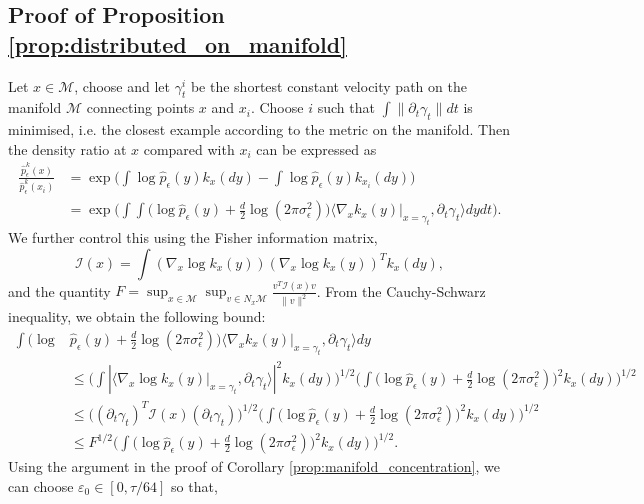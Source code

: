 \documentclass[10pt]{article}
\theoremstyle{plain}
\theoremstyle{definition}
\theoremstyle{remark}
\newcommand{\M}{{\mathcal{M}}}
\begin{document}
\subsection{Proof of Proposition \ref{prop:distributed_on_manifold}}
Let \(x \in \M\), choose and let \(\gamma^i_t\) be the shortest constant velocity path on the manifold \(\M\) connecting points \(x\) and \(x_i\). Choose \(i\) such that \(\int \|\partial_t \gamma_t\| dt\) is minimised, i.e. the closest example according to the metric on the manifold. Then the density ratio at \(x\) compared with \(x_i\) can be expressed as
\begin{align*}
    \frac{\hat{p}^{k}_\epsilon(x)}{\hat{p}^{k}_\epsilon(x_i)} &= \exp \bigg ( \int \log \hat{p}_\epsilon(y) k_{x}(dy) - \int \log \hat{p}_\epsilon(y) k_{x_i}(dy) \bigg )\\
    &= \exp \bigg ( \int \int \Big ( \log \hat{p}_\epsilon(y) + \frac{d}{2}\log(2\pi\sigma_\epsilon^2) \Big ) \langle \nabla_x k_{x}(y)\vert_{x=\gamma_t}, \partial_t \gamma_t \rangle dy dt \bigg ).
\end{align*}
We further control this using the Fisher information matrix,
\begin{equation*}
    \mathcal{I}(x) = \int (\nabla_x \log k_x(y)) (\nabla_x \log k_x(y))^T k_x(dy),
\end{equation*}
and the quantity \(F = \sup_{x \in \M} \sup_{v \in N_x \M}  \frac{v^T \mathcal{I}(x) v}{\|v\|^2}\). From the Cauchy-Schwarz inequality, we obtain the following bound:
\begin{align*}
    \int \Big ( \log & \hat{p}_\epsilon(y) + \frac{d}{2}\log(2\pi\sigma_\epsilon^2) \Big ) \langle \nabla_x k_{x}(y)\vert_{x=\gamma_t}, \partial_t \gamma_t \rangle dy\\
    &\leq \bigg ( \int |\langle \nabla_x \log k_{x}(y)\vert_{x=\gamma_t}, \partial_t \gamma_t \rangle|^2 k_{x}(dy) \bigg )^{1/2} \bigg ( \int \Big ( \log \hat{p}_\epsilon(y) + \frac{d}{2}\log(2\pi\sigma_\epsilon^2) \Big )^2 k_{x}(dy) \bigg )^{1/2}\\
    &\leq \Big ( (\partial_t \gamma_t)^T \mathcal{I}(x) (\partial_t \gamma_t) \Big )^{1/2} \bigg ( \int \Big ( \log \hat{p}_\epsilon(y) + \frac{d}{2}\log(2\pi\sigma_\epsilon^2) \Big )^2 k_{x}(dy) \bigg )^{1/2}\\
    &\leq F^{1/2} \bigg ( \int \Big ( \log \hat{p}_\epsilon(y) + \frac{d}{2}\log(2\pi\sigma_\epsilon^2) \Big )^2 k_{x}(dy) \bigg )^{1/2}.
\end{align*}
Using the argument in the proof of Corollary \ref{prop:manifold_concentration}, we can choose \(\varepsilon_0 \in [0, \tau/64]\) so that,
\end{document}

